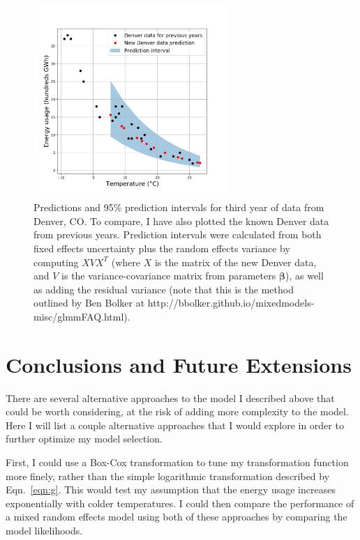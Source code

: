 \documentclass[11pt]{article}
\begin{document}
\begin{figure}[ht] \centering
  \includegraphics[width=0.65\textwidth]{denver_predictions.png}
  \caption{Predictions and 95\% prediction intervals for third year of data from Denver, CO. To compare, I have also plotted the known Denver data from previous years. Prediction intervals were calculated from both fixed effects uncertainty plus the random effects variance by computing $XVX^T$ (where $X$ is the matrix of the new Denver data, and $V$ is the variance-covariance matrix from parameters $\boldsymbol{\beta}$), as well as adding the residual variance (note that this is the method outlined by Ben Bolker at http://bbolker.github.io/mixedmodels-misc/glmmFAQ.html).}
  \label{fig:prediction}
\end{figure}

\section{\label{sec:conclusion}Conclusions and Future Extensions}

There are several alternative approaches to the model I described above that could be worth considering, at the risk of adding more complexity to the model. Here I will list a couple alternative approaches that I would explore in order to further optimize my model selection.

First, I could use a Box-Cox transformation to tune my transformation function more finely, rather than the simple logarithmic transformation described by Eqn.~\ref{eqn:g}. This would test my assumption that the energy usage increases exponentially with colder temperatures. I could then compare the performance of a mixed random effects model using both of these approaches by comparing the model likelihoods.
\end{document}
